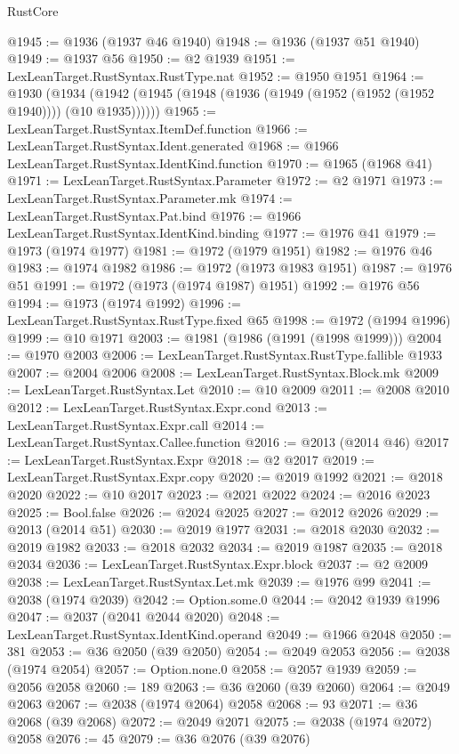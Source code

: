 \begin{lexlean}{RustCore}
\begin{coremodule}
@1945 := @1936 (@1937 @46 @1940)
@1948 := @1936 (@1937 @51 @1940)
@1949 := @1937 @56
@1950 := @2 @1939
@1951 := LexLeanTarget.RustSyntax.RustType.nat
@1952 := @1950 @1951
@1964 := @1930
    (@1934 (@1942 (@1945 (@1948 (@1936 (@1949 (@1952 (@1952 (@1952 @1940)))) (@10 @1935))))))
@1965 := LexLeanTarget.RustSyntax.ItemDef.function
@1966 := LexLeanTarget.RustSyntax.Ident.generated
@1968 := @1966 LexLeanTarget.RustSyntax.IdentKind.function
@1970 := @1965 (@1968 @41)
@1971 := LexLeanTarget.RustSyntax.Parameter
@1972 := @2 @1971
@1973 := LexLeanTarget.RustSyntax.Parameter.mk
@1974 := LexLeanTarget.RustSyntax.Pat.bind
@1976 := @1966 LexLeanTarget.RustSyntax.IdentKind.binding
@1977 := @1976 @41
@1979 := @1973 (@1974 @1977)
@1981 := @1972 (@1979 @1951)
@1982 := @1976 @46
@1983 := @1974 @1982
@1986 := @1972 (@1973 @1983 @1951)
@1987 := @1976 @51
@1991 := @1972 (@1973 (@1974 @1987) @1951)
@1992 := @1976 @56
@1994 := @1973 (@1974 @1992)
@1996 := LexLeanTarget.RustSyntax.RustType.fixed @65
@1998 := @1972 (@1994 @1996)
@1999 := @10 @1971
@2003 := @1981 (@1986 (@1991 (@1998 @1999)))
@2004 := @1970 @2003
@2006 := LexLeanTarget.RustSyntax.RustType.fallible @1933
@2007 := @2004 @2006
@2008 := LexLeanTarget.RustSyntax.Block.mk
@2009 := LexLeanTarget.RustSyntax.Let
@2010 := @10 @2009
@2011 := @2008 @2010
@2012 := LexLeanTarget.RustSyntax.Expr.cond
@2013 := LexLeanTarget.RustSyntax.Expr.call
@2014 := LexLeanTarget.RustSyntax.Callee.function
@2016 := @2013 (@2014 @46)
@2017 := LexLeanTarget.RustSyntax.Expr
@2018 := @2 @2017
@2019 := LexLeanTarget.RustSyntax.Expr.copy
@2020 := @2019 @1992
@2021 := @2018 @2020
@2022 := @10 @2017
@2023 := @2021 @2022
@2024 := @2016 @2023
@2025 := Bool.false
@2026 := @2024 @2025
@2027 := @2012 @2026
@2029 := @2013 (@2014 @51)
@2030 := @2019 @1977
@2031 := @2018 @2030
@2032 := @2019 @1982
@2033 := @2018 @2032
@2034 := @2019 @1987
@2035 := @2018 @2034
@2036 := LexLeanTarget.RustSyntax.Expr.block
@2037 := @2 @2009
@2038 := LexLeanTarget.RustSyntax.Let.mk
@2039 := @1976 @99
@2041 := @2038 (@1974 @2039)
@2042 := Option.some.{0}
@2044 := @2042 @1939 @1996
@2047 := @2037 (@2041 @2044 @2020)
@2048 := LexLeanTarget.RustSyntax.IdentKind.operand
@2049 := @1966 @2048
@2050 := 381
@2053 := @36 @2050 (@39 @2050)
@2054 := @2049 @2053
@2056 := @2038 (@1974 @2054)
@2057 := Option.none.{0}
@2058 := @2057 @1939
@2059 := @2056 @2058
@2060 := 189
@2063 := @36 @2060 (@39 @2060)
@2064 := @2049 @2063
@2067 := @2038 (@1974 @2064) @2058
@2068 := 93
@2071 := @36 @2068 (@39 @2068)
@2072 := @2049 @2071
@2075 := @2038 (@1974 @2072) @2058
@2076 := 45
@2079 := @36 @2076 (@39 @2076)

\end{coremodule}
\end{lexlean}
